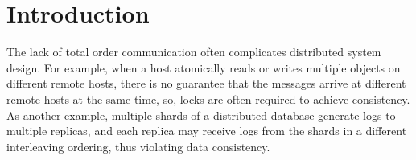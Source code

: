 \section{Introduction}
\label{sec:intro}

The lack of total order communication often complicates distributed system design.
For example, when a host atomically reads or writes multiple objects on different remote hosts, there is no guarantee that the messages arrive at different remote hosts at the same time, so, locks are often required to achieve consistency.
As another example, multiple shards of a distributed database generate logs to multiple replicas, and each replica may receive logs from the shards in a different interleaving ordering, thus violating data consistency.


